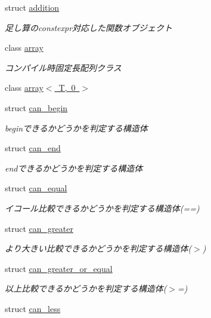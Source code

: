 \begin{DoxyCompactItemize}
\item 
struct \mbox{\hyperlink{structsaki_1_1addition}{addition}}
\begin{DoxyCompactList}\small\item\em 足し算のconstexpr対応した関数オブジェクト \end{DoxyCompactList}\item 
class \mbox{\hyperlink{classsaki_1_1array}{array}}
\begin{DoxyCompactList}\small\item\em コンパイル時固定長配列クラス \end{DoxyCompactList}\item 
class \mbox{\hyperlink{classsaki_1_1array_3_01_t_00_010_01_4}{array$<$ T, 0 $>$}}
\item 
struct \mbox{\hyperlink{structsaki_1_1can__begin}{can\+\_\+begin}}
\begin{DoxyCompactList}\small\item\em beginできるかどうかを判定する構造体 \end{DoxyCompactList}\item 
struct \mbox{\hyperlink{structsaki_1_1can__end}{can\+\_\+end}}
\begin{DoxyCompactList}\small\item\em endできるかどうかを判定する構造体 \end{DoxyCompactList}\item 
struct \mbox{\hyperlink{structsaki_1_1can__equal}{can\+\_\+equal}}
\begin{DoxyCompactList}\small\item\em イコール比較できるかどうかを判定する構造体(==) \end{DoxyCompactList}\item 
struct \mbox{\hyperlink{structsaki_1_1can__greater}{can\+\_\+greater}}
\begin{DoxyCompactList}\small\item\em より大きい比較できるかどうかを判定する構造体($>$) \end{DoxyCompactList}\item 
struct \mbox{\hyperlink{structsaki_1_1can__greater__or__equal}{can\+\_\+greater\+\_\+or\+\_\+equal}}
\begin{DoxyCompactList}\small\item\em 以上比較できるかどうかを判定する構造体($>$=) \end{DoxyCompactList}\item 
struct \mbox{\hyperlink{structsaki_1_1can__less}{can\+\_\+less}}

\end{DoxyCompactItemize}
